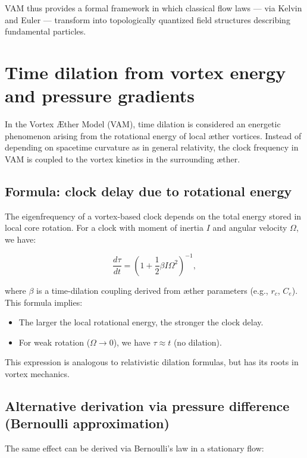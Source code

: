 \documentclass[preprint]{revtex4-2}
\begin{document}
VAM thus provides a formal framework in which classical flow laws — via Kelvin and Euler — transform into topologically quantized field structures describing fundamental particles.
\section{Time dilation from vortex energy and pressure gradients}\label{sec:appendix:5}

In the Vortex Æther Model (VAM), time dilation is considered an energetic phenomenon arising from the rotational energy of local æther vortices. Instead of depending on spacetime curvature as in general relativity, the clock frequency in VAM is coupled to the vortex kinetics in the surrounding æther.

\subsection{Formula: clock delay due to rotational energy}

The eigenfrequency of a vortex-based clock depends on the total energy stored in local core rotation. For a clock with moment of inertia $I$ and angular velocity $\Omega$, we have:

\begin{equation}
    \frac{d\tau}{dt} = \left(1 + \frac{1}{2} \beta I \Omega^2 \right)^{-1},
\end{equation}

where $\beta$ is a time-dilation coupling derived from æther parameters (e.g., $r_c$, $C_e$). This formula implies:

\begin{itemize}
    \item The larger the local rotational energy, the stronger the clock delay.
    \item For weak rotation ($\Omega \to 0$), we have $\tau \approx t$ (no dilation).
\end{itemize}

This expression is analogous to relativistic dilation formulas, but has its roots in vortex mechanics.

\subsection{Alternative derivation via pressure difference (Bernoulli approximation)}

The same effect can be derived via Bernoulli's law in a stationary flow:
\end{document}
